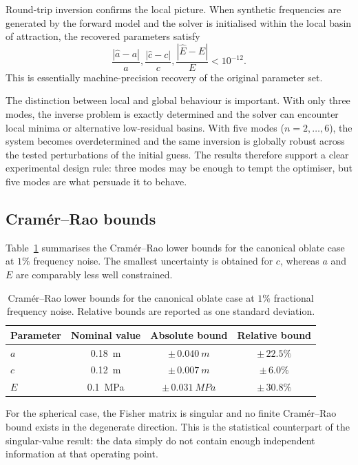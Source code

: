 Round-trip inversion confirms the local picture.  When synthetic frequencies are
generated by the forward model and the solver is initialised within the local
basin of attraction, the recovered parameters satisfy
\begin{equation}
  \frac{|\hat a-a|}{a},
  \frac{|\hat c-c|}{c},
  \frac{|\hat E-E|}{E}
  < 10^{-12}.
\end{equation}
This is essentially machine-precision recovery of the original parameter set.

The distinction between local and global behaviour is important.  With only
three modes, the inverse problem is exactly determined and the solver can
encounter local minima or alternative low-residual basins.  With five modes
($n=2,\ldots,6$), the system becomes overdetermined and the same inversion is
globally robust across the tested perturbations of the initial guess.  The
results therefore support a clear experimental design rule: three modes may be
enough to tempt the optimiser, but five modes are what persuade it to behave.

\subsection{Cram\'er--Rao bounds}

Table~\ref{tab:crlb} summarises the Cram\'er--Rao lower bounds for the canonical
oblate case at $1\%$ frequency noise.  The smallest uncertainty is obtained for
$c$, whereas $a$ and $E$ are comparably less well constrained.

\begin{table}[t]
  \centering
  \caption{Cram\'er--Rao lower bounds for the canonical oblate case at
  $1\%$ fractional frequency noise.  Relative bounds are reported as one
  standard deviation.}
  \label{tab:crlb}
  \begin{tabular}{lccc}
    \toprule
    Parameter & Nominal value & Absolute bound & Relative bound \\
    \midrule
    $a$ & \SI{0.18}{m}    & $\pm\,\SI{0.040}{m}$   & $\pm\,22.5\%$ \\
    $c$ & \SI{0.12}{m}    & $\pm\,\SI{0.007}{m}$   & $\pm\,6.0\%$ \\
    $E$ & \SI{0.1}{MPa}   & $\pm\,\SI{0.031}{MPa}$ & $\pm\,30.8\%$ \\
    \bottomrule
  \end{tabular}
\end{table}

For the spherical case, the Fisher matrix is singular and no finite
Cram\'er--Rao bound exists in the degenerate direction.  This is the statistical
counterpart of the singular-value result: the data simply do not contain enough
independent information at that operating point.

